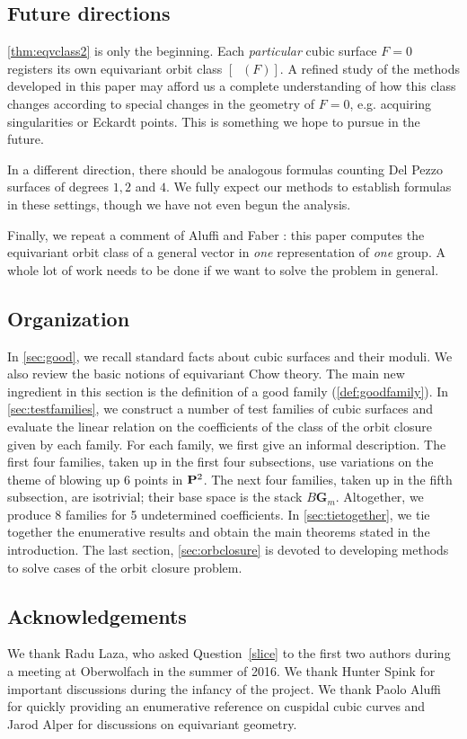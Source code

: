 \documentclass[11pt,reqno, letterpaper]{amsart}
\DeclareMathOperator{\Orb}{\overline{Orb}}
\numberwithin{equation}{section}
\newcommand{\G}{\mathbf G}
\begin{document}
\subsection{Future directions}

\autoref{thm:eqvclass2} is only the beginning.  Each {\sl particular}
cubic surface $F=0$ registers its own equivariant orbit class
$[\Orb(F)]$.  A refined study of the methods developed in this paper
may afford us a complete understanding of how this class changes
according to special changes in the geometry of $F=0$, e.g. acquiring
singularities or Eckardt points.  This is something we hope to pursue
in the future.

In a different direction, there should be analogous formulas counting
Del Pezzo surfaces of degrees $1,2$ and $4$.  We fully expect our
methods to establish formulas in these settings, though we have not
even begun the analysis.

Finally, we repeat a comment of Aluffi and Faber \cite{alu.fab:93}: this paper computes the equivariant orbit class of a general vector in \emph{one} representation of \emph{one} group.  A whole lot of work needs to be done if we want to solve the problem in general.

\subsection{Organization}
In \autoref{sec:good}, we recall standard facts about cubic surfaces and their moduli.
We also review the basic notions of equivariant Chow theory.
The main new ingredient in this section is the definition of a good family (\autoref{def:goodfamily}).
In \autoref{sec:testfamilies}, we construct a number of test families of cubic surfaces and evaluate the linear relation on the coefficients of the class of the orbit closure given by each family.
For each family, we first give an informal description.
The first four families, taken up in the first four subsections, use variations on the theme of blowing up 6 points in $\P^2$.
The next four families, taken up in the fifth subsection, are isotrivial; their base space is the stack $B\G_m$.
Altogether, we produce 8 families for 5 undetermined coefficients.
In \autoref{sec:tietogether}, we tie together the enumerative results and obtain the main theorems stated in the introduction.
The last section, \autoref{sec:orbclosure} is devoted to developing methods to solve cases of the orbit closure problem.

\subsection{Acknowledgements}
We thank Radu Laza, who asked Question~\ref{slice} to the first two
authors during a meeting at Oberwolfach in the summer of 2016.  We
thank Hunter Spink for important discussions during the infancy
of the project.  We thank Paolo Aluffi for quickly providing an
enumerative reference on cuspidal cubic curves and Jarod Alper for discussions on equivariant geometry.
\end{document}
